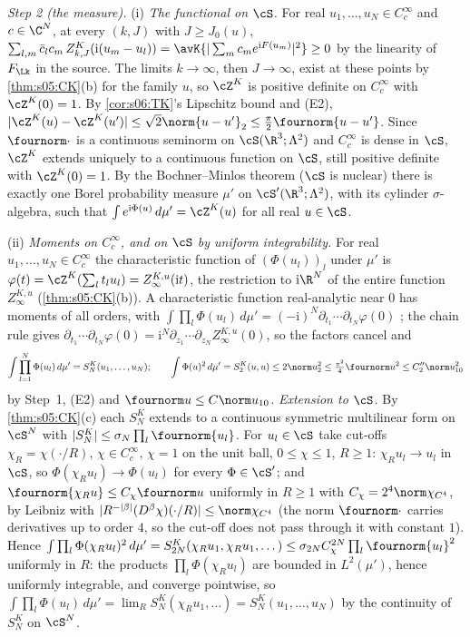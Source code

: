 \emph{Step 2 (the measure).} (i) \emph{The functional on $\cS$.} For real $u_1,\dots,u_N\in C^\infty_c$ and $c\in\C^N$, at every $(k,J)$ with $J\ge J_0(u)$, $\sum_{l,m}\bar c_lc_m\,Z^K_{k,J}(\mathrm i(u_m-u_l))=\avK{|\sum_mc_me^{\mathrm iF(u_m)}|^2}\ge0$ by the linearity of $F_{\Lk}$ in the source. The limits $k\to\infty$, then $J\to\infty$, exist at these points by \cref{thm:s05:CK}(b) for the family $u$, so $\cZ^K$ is positive definite on $C^\infty_c$ with $\cZ^K(0)=1$. By \cref{cor:s06:TK}'s Lipschitz bound and (E2), $|\cZ^K(u)-\cZ^K(u')|\le\sqrt2\norm{u-u'}_2\le\frac\pi2\fournorm{u-u'}$. Since $\fournorm\cdot$ is a continuous seminorm on $\cS(\R^3;\Lambda^2)$ and $C^\infty_c$ is dense in $\cS$, $\cZ^K$ extends uniquely to a continuous function on $\cS$, still positive definite with $\cZ^K(0)=1$. By the Bochner--Minlos theorem \cite{GJ,Jan97} ($\cS$ is nuclear) there is exactly one Borel probability measure $\mu'$ on $\cS'(\R^3;\Lambda^2)$, with its cylinder $\sigma$-algebra, such that $\int e^{\mathrm i\Phi(u)}\,d\mu'=\cZ^K(u)$ for all real $u\in\cS$.

(ii) \emph{Moments on $C^\infty_c$, and on $\cS$ by uniform integrability.} For real $u_1,\dots,u_N\in C^\infty_c$ the characteristic function of $(\Phi(u_l))_l$ under $\mu'$ is $\varphi(t)=\cZ^K(\sum_lt_lu_l)=Z^{K,u}_\infty(\mathrm it)$, the restriction to $\mathrm i\R^N$ of the entire function $Z^{K,u}_\infty$ (\cref{thm:s05:CK}(b)). A characteristic function real-analytic near $0$ has moments of all orders, with $\int\prod_l\Phi(u_l)\,d\mu'=(-\mathrm i)^N\partial_{t_1}\cdots\partial_{t_N}\varphi(0)$ \cite{Luk70}; the chain rule gives $\partial_{t_1}\cdots\partial_{t_N}\varphi(0)=\mathrm i^N\partial_{z_1}\cdots\partial_{z_N}Z^{K,u}_\infty(0)$, so the factors cancel and
\begin{equation}\label{eq:s09:moments}
\int\prod_{l=1}^N\Phi(u_l)\,d\mu'=S^K_N(u_1,\dots,u_N);\qquad\int\Phi(u)^2\,d\mu'=S^K_2(u,u)\le2\norm u_2^2\le\tfrac{\pi^2}4\fournorm u^2\le C_2''\norm u_{10}^2
\end{equation}
by Step~1, (E2) and $\fournorm u\le C\norm u_{10}$. \emph{Extension to $\cS$.} By \cref{thm:s05:CK}(c) each $S^K_N$ extends to a continuous symmetric multilinear form on $\cS^N$ with $|S^K_N|\le\sigma_N\prod_l\fournorm{u_l}$. For $u_l\in\cS$ take cut-offs $\chi_R=\chi(\cdot/R)$, $\chi\in C^\infty_c$, $\chi=1$ on the unit ball, $0\le\chi\le1$, $R\ge1$: $\chi_Ru_l\to u_l$ in $\cS$, so $\Phi(\chi_Ru_l)\to\Phi(u_l)$ for every $\Phi\in\cS'$; and $\fournorm{\chi_Ru}\le C_\chi\fournorm u$ uniformly in $R\ge1$ with $C_\chi=2^4\norm\chi_{C^4}$, by Leibniz with $|R^{-|\beta|}(D^\beta\chi)(\cdot/R)|\le\norm\chi_{C^4}$ (the norm $\fournorm\cdot$ carries derivatives up to order $4$, so the cut-off does not pass through it with constant $1$). Hence $\int\prod_l\Phi(\chi_Ru_l)^2\,d\mu'=S^K_{2N}(\chi_Ru_1,\chi_Ru_1,\dots)\le\sigma_{2N}C_\chi^{2N}\prod_l\fournorm{u_l}^2$ uniformly in $R$: the products $\prod_l\Phi(\chi_Ru_l)$ are bounded in $L^2(\mu')$, hence uniformly integrable, and converge pointwise, so $\int\prod_l\Phi(u_l)\,d\mu'=\lim_RS^K_N(\chi_Ru_1,\dots)=S^K_N(u_1,\dots,u_N)$ by the continuity of $S^K_N$ on $\cS^N$.

